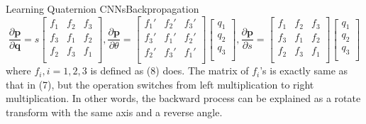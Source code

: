 \documentclass{beamer}
\begin{document}
\begin{frame}{Learning Quaternion CNNs}{Backpropagation}
    \begin{equation*}
        \frac{\partial \textbf{p}}{\partial \textbf{q}}=s
        \begin{bmatrix}
            f_1&f_2&f_3\\
            f_3&f_1&f_2\\
            f_2&f_3&f_1\\
        \end{bmatrix},
        \frac{\partial \textbf{p}}{\partial \theta}=
        \begin{bmatrix}
            f_1'&f_2'&f_3'\\
            f_3'&f_1'&f_2'\\
            f_2'&f_3'&f_1'\\
        \end{bmatrix}
        \begin{bmatrix}
            q_1\\
            q_2\\
            q_3\\
        \end{bmatrix},
        \frac{\partial \textbf{p}}{\partial s}=
        \begin{bmatrix}
            f_1&f_2&f_3\\
            f_3&f_1&f_2\\
            f_2&f_3&f_1\\
        \end{bmatrix}
        \begin{bmatrix}
            q_1\\
            q_2\\
            q_3\\
        \end{bmatrix}
    \end{equation*}
    where $f_i, i=1,2,3$  is defined as (8) does. The matrix of $f_i$'s is exactly same
    as that in (7), but the operation switches from left multiplication to right multiplication. In other words, the backward process can be explained as a rotate
    transform with the same axis and a reverse angle.
\end{frame}
\end{document}
